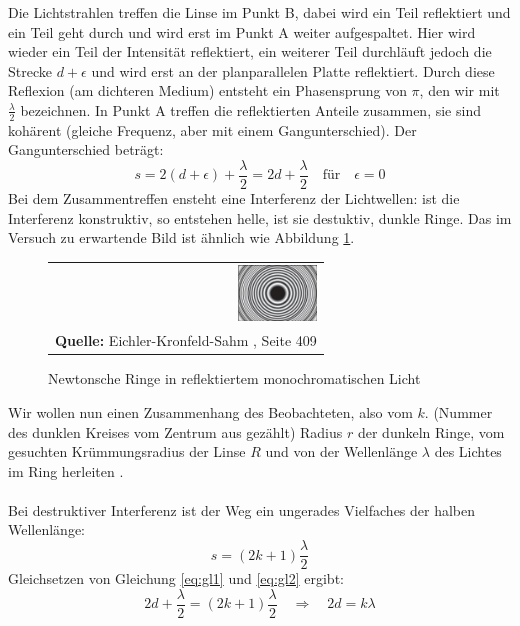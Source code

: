 \documentclass[a4paper,titlepage]{scrartcl}
\numberwithin{equation}{section}
\begin{document}
Die Lichtstrahlen treffen die Linse im Punkt B, dabei wird ein Teil reflektiert und ein Teil geht durch und wird erst im Punkt A weiter aufgespaltet. Hier wird wieder ein Teil der Intensität reflektiert, ein weiterer Teil durchläuft jedoch die Strecke $d + \epsilon$ und wird erst an der planparallelen Platte reflektiert. Durch diese Reflexion (am dichteren Medium) entsteht ein Phasensprung von $\pi$, den wir mit $\frac{\lambda}{2}$ bezeichnen. In Punkt A treffen die reflektierten Anteile zusammen, sie sind kohärent (gleiche Frequenz, aber mit einem Gangunterschied). Der Gangunterschied beträgt:
\begin{equation}
\label{eq:gl1}
s=2(d+\epsilon)+ \frac{\lambda}{2}=2d + \frac{\lambda}{2} \quad \text{für} \quad \epsilon=0
\end{equation}
Bei dem Zusammentreffen ensteht eine Interferenz der Lichtwellen: ist die Interferenz konstruktiv, so entstehen helle, ist sie destuktiv, dunkle Ringe. Das im Versuch zu erwartende Bild ist ähnlich wie Abbildung \ref{fig:netwon}.
\begin{figure}[H]
	\centering
	\begin{tabular}{@{}r@{}}
		\includegraphics[width=0.3\textwidth]{bilder/newton.JPG}\\
		\footnotesize\sffamily\textbf{Quelle:} Eichler-Kronfeld-Sahm \cite{eichler}, Seite 409
	\end{tabular}
	\caption{Newtonsche Ringe in reflektiertem monochromatischen Licht}
	\label{fig:netwon}
\end{figure}
Wir wollen nun einen Zusammenhang des Beobachteten, also vom $k.$ (Nummer des dunklen Kreises vom Zentrum aus gezählt) Radius $r$ der dunkeln Ringe, vom gesuchten Krümmungsradius der Linse $R$ und von der Wellenlänge $\lambda$ des Lichtes im Ring herleiten \cite{wiki:newtonRinge}.\\ \\
Bei destruktiver Interferenz ist der Weg ein ungerades Vielfaches der halben Wellenlänge:
\begin{equation}
\label{eq:gl2}
s=(2k+1)\frac{\lambda}{2}
\end{equation}
Gleichsetzen von Gleichung \ref{eq:gl1} und \ref{eq:gl2} ergibt:
\begin{equation}
\label{eq:gl3}
2d + \frac{\lambda}{2}=(2k+1)\frac{\lambda}{2} \quad \Rightarrow \quad 2d=k\lambda
\end{equation}
\end{document}
